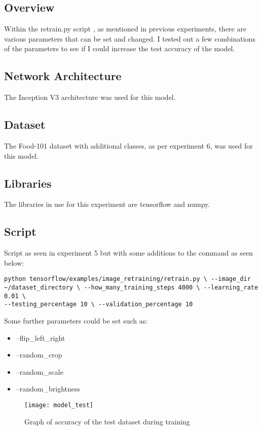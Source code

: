 \subsection*{Overview}
Within the retrain.py script \textcite{retrainInception}, as mentioned in
previous experiments, there are various parameters that can be set and changed.
I tested out a few combinations of the parameters to see if I could increase the
test accuracy of the model.

\subsection*{Network Architecture}
The Inception V3 architecture was used for this model.

\subsection*{Dataset}
The Food-101 dataset \textcite{food101} with additional classes, as per
experiment 6, was used for this model.

\subsection*{Libraries}
The libraries in use for this experiment are tensorflow and numpy.

\subsection*{Script}
Script as seen in experiment 5 but with some additions to the command as seen
below:

\begin{lstlisting}
python tensorflow/examples/image_retraining/retrain.py \ --image_dir
~/dataset_directory \ --how_many_training_steps 4000 \ --learning_rate 0.01 \
--testing_percentage 10 \ --validation_percentage 10
\end{lstlisting}

Some further parameters could be set such as:
\begin{itemize}
	\item{--flip\_left\_right}
	\item{--random\_crop}
	\item{--random\_scale}
	\item{--random\_brightness}
\end{itemize}

\begin{figure}
    \texttt{[image: model\_test]}
     \caption{Graph of accuracy of the test dataset during training}
     \label{fig:model_train_test}
\end{figure}

